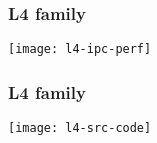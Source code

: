 \begin{frame}[plain]
	\frametitle{L4 family}
	
	\centering
	\texttt{[image: l4-ipc-perf]}
	
\end{frame}

\begin{frame}[plain]
	\frametitle{L4 family}
	
	\centering
	\texttt{[image: l4-src-code]}
	
\end{frame}


